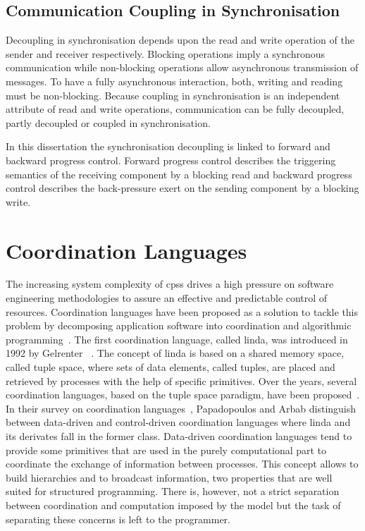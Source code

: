 \subsection{Communication Coupling in Synchronisation}
\label{sect_background_decoupling_sync}
Decoupling in synchronisation depends upon the read and write operation of the sender and receiver respectively.
Blocking operations imply a synchronous communication while non-blocking operations allow asynchronous transmission of messages.
To have a fully asynchronous interaction, both, writing and reading must be non-blocking.
Because coupling in synchronisation is an independent attribute of read and write operations, communication can be fully decoupled, partly decoupled or coupled in synchronisation.

In this dissertation the synchronisation decoupling is linked to forward and backward progress control.
Forward progress control describes the triggering semantics of the receiving component by a blocking read and backward progress control describes the back-pressure exert on the sending component by a blocking write.

\section{Coordination Languages}
\label{sect_background_coord}
The increasing system complexity of \glspl{cps} drives a high pressure on software engineering methodologies to assure an effective and predictable control of resources.
Coordination languages have been proposed as a solution to tackle this problem by decomposing application software into coordination and algorithmic programming~\cite{lee2008}.
The first coordination language, called \gls*{linda}, was introduced in 1992 by Gelrenter \etal~\cite{gelernter1992}.
The concept of \gls*{linda} is based on a shared memory space, called tuple space, where sets of data elements, called tuples, are placed and retrieved by processes with the help of specific primitives.
Over the years, several coordination languages, based on the tuple space paradigm, have been proposed~\cite{rossi2001, omicini2011}.
In their survey on coordination languages~\cite{papadopoulos1998}, Papadopoulos and Arbab distinguish between data-driven and control-driven coordination languages where \gls*{linda} and its derivates fall in the former class.
Data-driven coordination languages tend to provide some primitives that are used in the purely computational part to coordinate the exchange of information between processes.
This concept allows to build hierarchies and to broadcast information, two properties that are well suited for structured programming.
There is, however, not a strict separation between coordination and computation imposed by the model but the task of separating these concerns is left to the programmer.

